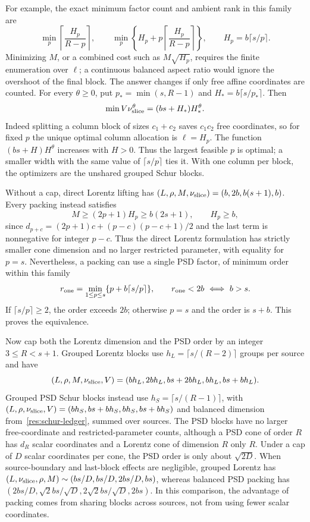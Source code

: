 For example, the exact minimum factor count and ambient rank in this
family are
\[
 \min_p\left\lceil\frac{H_p}{R-p}\right\rceil,
 \qquad
 \min_p\left\{H_p+p\left\lceil\frac{H_p}{R-p}\right\rceil\right\},
 \qquad H_p=b\lceil s/p\rceil.
\]
Minimizing $M$, or a combined cost such as $M\sqrt{H_p}$, requires the
finite enumeration over $\ell$; a continuous balanced aspect ratio would
ignore the overshoot of the final block. The answer changes
if only free affine coordinates are counted. For every $\theta\geq0$, put
$p_*=\min(s,R-1)$ and $H_*=b\lceil s/p_*\rceil$. Then
\begin{equation}\label{res:free-optimum}
 \min V\nu_{\rm slice}^{\theta}=(bs+H_*)H_*^{\theta}.
\end{equation}
Indeed splitting a column block of sizes $c_1+c_2$ saves $c_1c_2$ free
coordinates, so for fixed $p$ the unique optimal column allocation is
$\ell=H_p$. The function $(bs+H)H^\theta$ increases with $H>0$.
Thus the largest feasible $p$ is optimal; a smaller width with the same
value of $\lceil s/p\rceil$ ties it. With one column per block, the
optimizers are the unshared grouped Schur blocks.

Without a cap, direct Lorentz lifting has
$(L,\rho,M,\nu_{\rm slice})=(b,2b,b(s+1),b)$.
Every packing instead satisfies
\begin{equation}\label{res:packing-dimension}
 M\geq(2p+1)H_p\geq b(2s+1),\qquad H_p\geq b,
\end{equation}
since
$d_{p+c}=(2p+1)c+(p-c)(p-c+1)/2$ and the last term is nonnegative
for integer $p-c$. Thus the direct Lorentz formulation has strictly
smaller cone dimension and no larger restricted parameter, with equality
for $p=s$. Nevertheless, a packing can use
a single PSD factor, of minimum order within this family
\[
 r_{\rm one}=\min_{1\leq p\leq s}\{p+b\lceil s/p\rceil\},
 \qquad r_{\rm one}<2b\ \Longleftrightarrow\ b>s.
\]
If $\lceil s/p\rceil\geq2$, the order exceeds $2b$; otherwise $p=s$
and the order is $s+b$. This proves the equivalence.

Now cap both the Lorentz dimension and the PSD order by an integer
$3\leq R<s+1$. Grouped Lorentz blocks use $h_L=\lceil s/(R-2)\rceil$ groups per source and have
\[
 (L,\rho,M,\nu_{\rm slice},V)
 =(bh_L,2bh_L,bs+2bh_L,bh_L,bs+bh_L).
\]
Grouped PSD Schur blocks instead use $h_S=\lceil s/(R-1)\rceil$,
with $(L,\rho,\nu_{\rm slice},V)=(bh_S,bs+bh_S,bh_S,bs+bh_S)$
and balanced dimension from~\eqref{res:schur-ledger}, summed over sources.
The PSD blocks have no larger free-coordinate and restricted-parameter
counts, although a PSD cone of order $R$ has $d_R$ scalar coordinates and
a Lorentz cone of dimension $R$ only $R$. Under a cap of $D$ scalar
coordinates per cone, the PSD order is only about $\sqrt{2D}$. When
source-boundary and last-block effects are negligible, grouped Lorentz has
$(L,\nu_{\rm slice},\rho,M)\sim(bs/D,bs/D,2bs/D,bs)$,
whereas balanced PSD packing has
$(2bs/D,\sqrt2bs/\sqrt D,2\sqrt2bs/\sqrt D,2bs)$.
In this comparison, the advantage of packing comes from sharing blocks
across sources, not from using fewer scalar coordinates.

